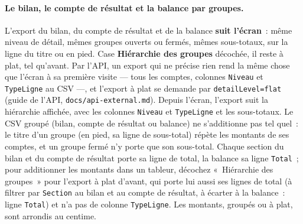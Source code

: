 \documentclass[a4paper,11pt,oneside]{article}
\begin{document}
\paragraph{Le bilan, le compte de résultat et la balance par groupes.} L'export du bilan, du
compte de résultat et de la balance \textbf{suit l'écran}~: même niveau de détail, mêmes groupes ouverts ou fermés, mêmes
sous-totaux, sur la ligne du titre ou en pied. Case \textbf{Hiérarchie des groupes} décochée, il reste à
plat, tel qu'avant. Par l'API, un export qui ne précise rien rend la même chose que l'écran à sa première
visite --- tous les comptes, colonnes \texttt{Niveau} et \texttt{TypeLigne} au CSV ---, et l'export à plat se
demande par \texttt{detailLevel=flat} (guide de l'API, \texttt{docs/api-external.md}). Depuis l'écran, l'export suit la hiérarchie affichée, avec les colonnes
\texttt{Niveau} et \texttt{TypeLigne} et les sous-totaux. Le CSV groupé (bilan, compte de résultat ou balance) ne s'additionne pas tel quel~: le titre d'un groupe (en pied, sa ligne de sous-total) répète les montants de ses comptes, et un groupe fermé n'y porte que son sous-total. Chaque section du bilan et du compte de résultat porte sa ligne de total, la balance sa ligne \texttt{Total}~; pour additionner les montants dans un tableur, décochez «~Hiérarchie des groupes~» pour l'export à plat d'avant, qui porte lui aussi ses lignes de total (à filtrer par \texttt{Section} au bilan et au compte de résultat, à écarter à la balance~: ligne \texttt{Total}) et n'a pas de colonne \texttt{TypeLigne}. Les montants, groupés ou à plat, sont arrondis au centime.
\end{document}
